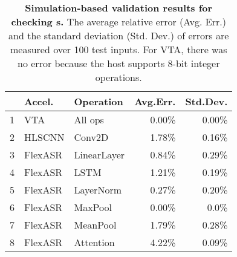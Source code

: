 \begin{table}
\caption{
\textbf{
Simulation-based validation results for checking {\mapping}s.
}
The average relative error (Avg. Err.) and the standard deviation (Std. Dev.) of errors are measured 
over 100 test inputs. %
For VTA, 
there was no error because the host supports 
8-bit integer operations.
}
\label{tab.layer-sim}
\centering
\begin{small}
\begin{tabular}{|c|l|l|r|r|}
\hline
  & Accel. & Operation & Avg.Err. & Std.Dev.  \\
  \hline \hline
  1 & VTA & All ops & 0.00\% & 0.00\% \\ %
  2 & HLSCNN & Conv2D & 1.78\% & 0.16\% \\ %
  3 & FlexASR & LinearLayer & 0.84\% & 0.29\% \\ %
  4 & FlexASR & LSTM & 1.21\% & 0.19\% \\ %
  5 & FlexASR & LayerNorm & 0.27\% & 0.20\% \\ %
  6 & FlexASR & MaxPool & 0.00\% & 0.0\% \\ %
  7 & FlexASR & MeanPool & 1.79\% & 0.28\% \\ %
  8 & FlexASR & Attention & 4.22\% & 0.09\% \\ 
\hline
\end{tabular}
\end{small}
\end{table}